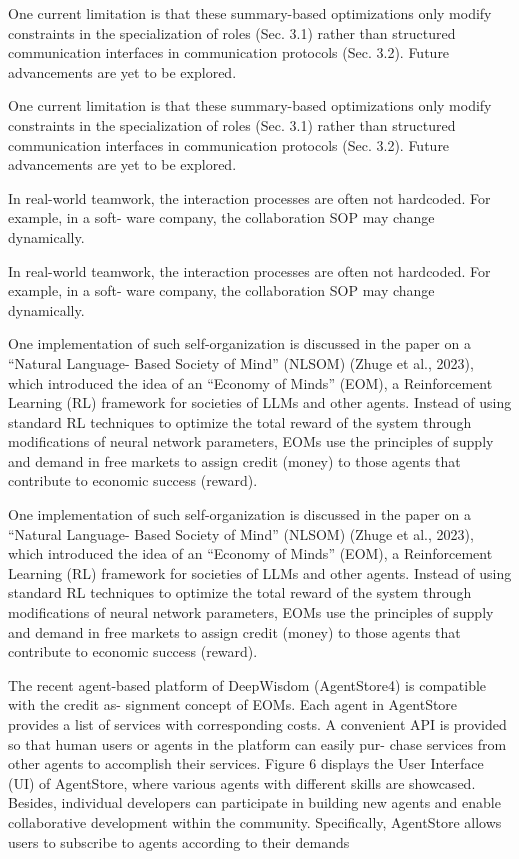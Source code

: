 \documentclass[12pt]{article}
\begin{document}
One current limitation is that these summary-based optimizations only modify constraints in the
specialization of roles (Sec. 3.1) rather than structured communication interfaces in communication
protocols (Sec. 3.2). Future advancements are yet to be explored.


One current limitation is that these summary-based optimizations only modify constraints in the
specialization of roles (Sec. 3.1) rather than structured communication interfaces in communication
protocols (Sec. 3.2). Future advancements are yet to be explored.


In real-world teamwork, the interaction processes are often not hardcoded. For example, in a soft-
ware company, the collaboration SOP may change dynamically.


In real-world teamwork, the interaction processes are often not hardcoded. For example, in a soft-
ware company, the collaboration SOP may change dynamically.


One implementation of such self-organization is discussed in the paper on a “Natural Language-
Based Society of Mind” (NLSOM) (Zhuge et al., 2023), which introduced the idea of an “Economy
of Minds” (EOM), a Reinforcement Learning (RL) framework for societies of LLMs and other
agents. Instead of using standard RL techniques to optimize the total reward of the system through
modifications of neural network parameters, EOMs use the principles of supply and demand in free
markets to assign credit (money) to those agents that contribute to economic success (reward).


One implementation of such self-organization is discussed in the paper on a “Natural Language-
Based Society of Mind” (NLSOM) (Zhuge et al., 2023), which introduced the idea of an “Economy
of Minds” (EOM), a Reinforcement Learning (RL) framework for societies of LLMs and other
agents. Instead of using standard RL techniques to optimize the total reward of the system through
modifications of neural network parameters, EOMs use the principles of supply and demand in free
markets to assign credit (money) to those agents that contribute to economic success (reward).


The recent agent-based platform of DeepWisdom (AgentStore4) is compatible with the credit as-
signment concept of EOMs. Each agent in AgentStore provides a list of services with corresponding
costs. A convenient API is provided so that human users or agents in the platform can easily pur-
chase services from other agents to accomplish their services. Figure 6 displays the User Interface
(UI) of AgentStore, where various agents with different skills are showcased. Besides, individual
developers can participate in building new agents and enable collaborative development within the
community. Specifically, AgentStore allows users to subscribe to agents according to their demands
\end{document}
